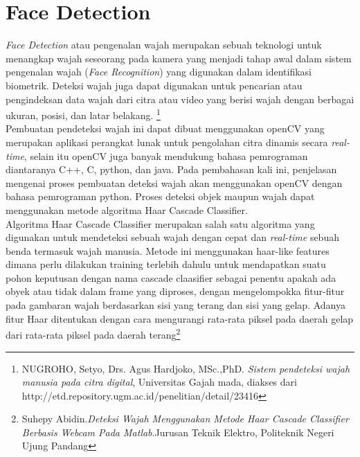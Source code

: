 \section{Face Detection}
\emph{Face Detection} atau pengenalan wajah merupakan sebuah teknologi untuk menangkap wajah seseorang pada kamera yang menjadi tahap awal dalam sistem pengenalan wajah (\emph{Face Recognition}) 
yang digunakan dalam identifikasi biometrik. Deteksi wajah juga dapat digunakan untuk pencarian atau pengindeksan data wajah dari citra atau video yang berisi wajah dengan berbagai ukuran, posisi, dan latar belakang.
\footnote{NUGROHO, Setyo, Drs. Agus Hardjoko, MSc.,PhD. \emph{Sistem pendeteksi wajah manusia pada citra digital}, Universitas Gajah mada, diakses dari http://etd.repository.ugm.ac.id/penelitian/detail/23416}\\

Pembuatan pendeteksi wajah ini dapat dibuat menggunakan openCV yang  merupakan aplikasi perangkat lunak untuk pengolahan citra dinamis secara \emph{real-time}, selain itu openCV juga banyak mendukung 
bahasa pemrograman diantaranya C++, C, python, dan java. Pada pembahasan kali ini, penjelasan mengenai proses pembuatan deteksi wajah akan menggunakan openCV dengan bahasa pemrograman python. 
Proses deteksi objek maupun wajah dapat menggunakan metode algoritma Haar Cascade Classifier.\\

Algoritma Haar Cascade Classifier merupakan salah satu algoritma yang digunakan untuk mendeteksi sebuah wajah dengan cepat dan \emph{real-time} sebuah benda termasuk wajah manusia. 
Metode ini menggunakan haar-like features dimana perlu dilakukan training terlebih dahulu untuk mendapatkan suatu pohon keputusan dengan nama cascade claasifier sebagai penentu 
apakah ada obyek atau tidak dalam frame yang diproses, dengan mengelompokka fitur-fitur pada gambaran wajah berdasarkan sisi yang terang dan sisi yang gelap. Adanya fitur Haar
ditentukan dengan cara mengurangi rata-rata piksel pada daerah gelap dari rata-rata piksel pada daerah terang\footnote{Suhepy Abidin.\emph{Deteksi Wajah Menggunakan Metode Haar 
Cascade Classifier Berbasis Webcam Pada Matlab}.Jurusan Teknik Elektro, Politeknik Negeri Ujung Pandang}
